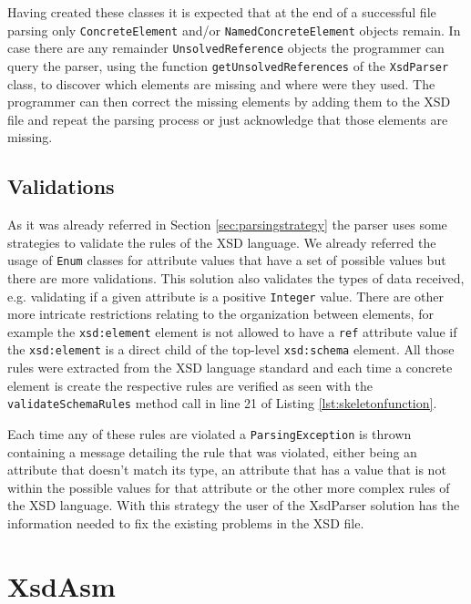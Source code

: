 \noindent
Having created these classes it is expected that at the end of a successful file parsing only \texttt{ConcreteElement} and/or \texttt{NamedConcreteElement} objects remain. In case there are any remainder \texttt{UnsolvedReference} objects the programmer can query the parser, using the function \texttt{getUnsolvedReferences} of the \texttt{XsdParser} class, to discover which elements are missing and where were they used. The programmer can then correct the missing elements by adding them to the \ac{XSD} file and repeat the parsing process or just acknowledge that those elements are missing. 

\subsection{Validations}

As it was already referred in Section \ref{sec:parsingstrategy} the parser uses some strategies to validate the rules of the \ac{XSD} language. We already referred the usage of \texttt{Enum} classes for attribute values that have a set of possible values but there are more validations. This solution also validates the types of data received, e.g. validating if a given attribute is a positive \texttt{Integer} value. There are other more intricate restrictions relating to the organization between elements, for example the \texttt{xsd:element} element is not allowed to have a \texttt{ref} attribute value if the \texttt{xsd:element} is a direct child of the top-level \texttt{xsd:schema} element. All those rules were extracted from the \ac{XSD} language standard and each time a concrete element is create the respective rules are verified as seen with the \texttt{validateSchemaRules} method call in line 21 of Listing \ref{lst:skeletonfunction}. 

\noindent
Each time any of these rules are violated a \texttt{ParsingException} is thrown containing a message detailing the rule that was violated, either being an attribute that doesn't match its type, an attribute that has a value that is not within the possible values for that attribute or the other more complex rules of the \ac{XSD} language. With this strategy the user of the XsdParser solution has the information needed to fix the existing problems in the \ac{XSD} file.

\section{XsdAsm} %
\label{sec:xsdasm}

